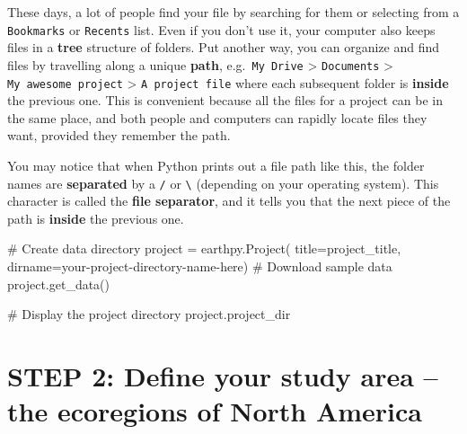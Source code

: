 \documentclass[
  letterpaper,
  DIV=11,
  numbers=noendperiod,
  oneside]{scrreprt}
\newenvironment{Shaded}{\begin{snugshade}}{\end{snugshade}}
\newcommand{\CommentTok}[1]{\textcolor[rgb]{0.37,0.37,0.37}{#1}}
\newcommand{\NormalTok}[1]{\textcolor[rgb]{0.00,0.23,0.31}{#1}}
\newcommand{\OperatorTok}[1]{\textcolor[rgb]{0.37,0.37,0.37}{#1}}
\newcommand{\StringTok}[1]{\textcolor[rgb]{0.13,0.47,0.30}{#1}}
\begin{document}
\begin{tcolorbox}[enhanced jigsaw, colbacktitle=quarto-callout-tip-color!10!white, opacityback=0, bottomtitle=1mm, toptitle=1mm, bottomrule=.15mm, left=2mm, colframe=quarto-callout-tip-color-frame, leftrule=.75mm, opacitybacktitle=0.6, colback=white, rightrule=.15mm, toprule=.15mm, breakable, titlerule=0mm, title=\textcolor{quarto-callout-tip-color}{\faLightbulb}\hspace{0.5em}{File structure}, coltitle=black, arc=.35mm]

These days, a lot of people find your file by searching for them or
selecting from a \texttt{Bookmarks} or \texttt{Recents} list. Even if
you don't use it, your computer also keeps files in a \textbf{tree}
structure of folders. Put another way, you can organize and find files
by travelling along a unique \textbf{path}, e.g.~\texttt{My\ Drive}
\textgreater{} \texttt{Documents} \textgreater{}
\texttt{My\ awesome\ project} \textgreater{} \texttt{A\ project\ file}
where each subsequent folder is \textbf{inside} the previous one. This
is convenient because all the files for a project can be in the same
place, and both people and computers can rapidly locate files they want,
provided they remember the path.

You may notice that when Python prints out a file path like this, the
folder names are \textbf{separated} by a \texttt{/} or
\texttt{\textbackslash{}} (depending on your operating system). This
character is called the \textbf{file separator}, and it tells you that
the next piece of the path is \textbf{inside} the previous one.

\end{tcolorbox}

\begin{Shaded}
\begin{Highlighting}[]
\CommentTok{\# Create data directory}
\NormalTok{project }\OperatorTok{=}\NormalTok{ earthpy.Project(}
\NormalTok{    title}\OperatorTok{=}\NormalTok{project\_title,}
\NormalTok{    dirname}\OperatorTok{=}\StringTok{\textquotesingle{}your{-}project{-}directory{-}name{-}here\textquotesingle{}}\NormalTok{)}
\CommentTok{\# Download sample data}
\NormalTok{project.get\_data()}

\CommentTok{\# Display the project directory}
\NormalTok{project.project\_dir}
\end{Highlighting}
\end{Shaded}

\section{STEP 2: Define your study area -- the ecoregions of North
America}\label{step-2-define-your-study-area-the-ecoregions-of-north-america}
\end{document}
